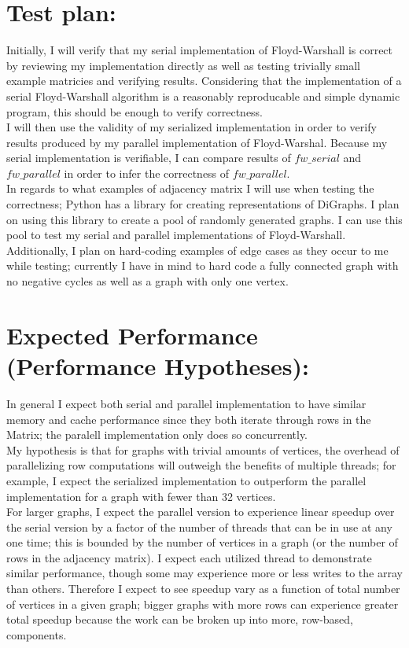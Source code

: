 \documentclass[]{article}
\begin{document}
		
		\section{Test plan:} 
		Initially, I will verify that my serial implementation of Floyd-Warshall is correct by reviewing my implementation directly as well as testing trivially small example matricies and verifying results. Considering that the implementation of a serial Floyd-Warshall algorithm is a reasonably reproducable and simple dynamic program, this should be enough to verify correctness.
		\\
		I will then use the validity of my serialized implementation in order to verify results produced by my parallel implementation of Floyd-Warshal. Because my serial implementation is verifiable, I can compare results of $fw\_serial$ and $fw\_parallel$ in order to infer the correctness of $fw\_parallel$. 
		\\
		In regards to what examples of adjacency matrix I will use when testing the correctness; Python has a library for creating representations of DiGraphs. I plan on using this library to create a pool of randomly generated graphs. I can use this pool to test my serial and parallel implementations of Floyd-Warshall. Additionally, I plan on hard-coding examples of edge cases as they occur to me while testing; currently I have in mind to hard code a fully connected graph with no negative cycles as well as a graph with only one vertex.
		
		
		\section{Expected Performance (Performance Hypotheses):} 
		In general I expect both serial and parallel implementation to have similar memory and cache performance since they both iterate through rows in the Matrix; the paralell implementation only does so concurrently.
		\\
		My hypothesis is that for graphs with trivial amounts of vertices, the overhead of parallelizing row computations will outweigh the benefits of multiple threads; for example, I expect the serialized implementation to outperform the parallel implementation for a graph with fewer than 32 vertices.
		\\
		For larger graphs, I expect the parallel version to experience linear speedup over the serial version by a factor of the number of threads that can be in use at any one time; this is bounded by the number of vertices in a graph (or the number of rows in the adjacency matrix). I expect each utilized thread to demonstrate similar performance, though some may experience more or less writes to the array than others. Therefore I expect to see speedup vary as a function of total number of vertices in a given graph; bigger graphs with more rows can experience greater total speedup because the work can be broken up into more, row-based, components.
	
\end{document}
